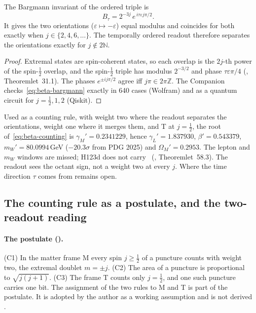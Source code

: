 \begin{proposition}
\label{prop:beta-octant}
The Bargmann invariant of the ordered triple is
\begin{equation}
 B_\tau=2^{-3j}\,e^{\,i\tau\varepsilon j\pi/2}.
 \label{eq:beta-bargmann}
\end{equation}
It gives the two orientations ($\varepsilon\mapsto-\varepsilon$) equal modulus and coincides for both exactly when $j\in\{2,4,6,\dots\}$.  The
temporally ordered readout therefore separates the orientations exactly for $j\notin2\mathbb N$.
\end{proposition}

\begin{proof}
Extremal states are spin-coherent states, so each overlap is the $2j$-th power of the spin-$\tfrac12$ overlap, and the spin-$\tfrac12$ triple has
modulus $2^{-3/2}$ and phase $\tau\varepsilon\pi/4$ (, Theoremlet~31.1).  The phases $e^{\pm ij\pi/2}$ agree iff $j\pi\in2\pi\mathbb Z$.
The Companion checks~\eqref{eq:beta-bargmann} exactly in 640 cases (Wolfram) and as a quantum circuit for $j=\tfrac12,1,2$ (Qiskit).
\end{proof}

Used as a counting rule, with weight two where the readout separates the orientations, weight one where it merges them, and T at $j=\tfrac12$,
the root of~\eqref{eq:beta-counting} is $\gamma_M'=0.2341229$, hence $\gamma_L'=1.837930$, $\beta'=0.543379$, $m_W'=80.0994$\,GeV ($-20.3\sigma$
from PDG 2025) and $\Omega_M'=0.2953$.  The lepton and $m_W$ windows are missed; H123d does not carry \Refuted\ (, Theoremlet~58.3).  The
readout sees the octant sign, not a weight two at every $j$.  Where the time direction $\tau$ comes from remains open.

\subsection{The counting rule as a postulate, and the two-readout reading}
\label{sec:beta-postulate}

\paragraph{The postulate ().}  (C1) In the matter frame M every spin $j\ge\tfrac12$ of a puncture counts with weight two, the extremal
doublet $m=\pm j$.  (C2) The area of a puncture is proportional to $\sqrt{j(j+1)}$.  (C3) The frame T counts only $j=\tfrac12$, and one such
puncture carries one bit.  The assignment of the two rules to M and T is part of the postulate.  It is adopted by the author as a working
assumption and is not derived \Conditional.

